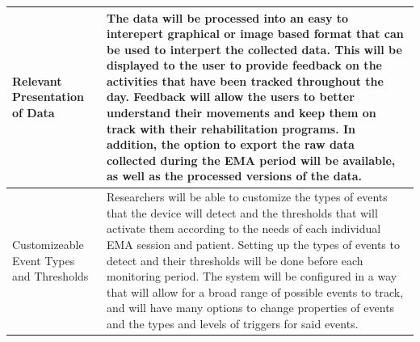 \documentclass[12pt]{article}
\begin{document}
\begin{center}
\begin{tabular}{ | m{7em} | m{32em}| }
        \hline
        Relevant \linebreak Presentation of Data                   & The data will be processed into an easy to interepert graphical or image based format that can be used to interpert the collected data. This will be displayed to the user to provide feedback on the activities that have been tracked throughout the day. Feedback will allow the users to better understand their movements and keep them on track with their rehabilitation programs. In addition, the option to export the raw data collected during the EMA period will be available, as well as the processed versions of the data.                                                                                                                                                                                      \\
	\hline
	Customizeable Event Types and Thresholds			& Researchers will be able to customize the types of events that the device will detect and the thresholds that will activate them according to the needs of each individual EMA session and patient. Setting up the types of events to detect and their thresholds will be done before each monitoring period. The system will be configured in a way that will allow for a broad range of possible events to track, and will have many options to change properties of events and the types and levels of triggers for said events.
\\
        \hline
    \end{tabular}
\end{center}

\pagebreak
\end{document}
